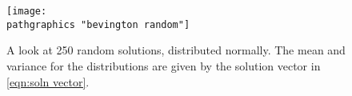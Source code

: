 \begin{figure}[t]
	\texttt{[image: \\pathgraphics "bevington random"]}
	\caption[A look at 250 random solutions, distributed normally]{A look at 250 random solutions, distributed normally. The mean and variance for the distributions are given by the solution vector in \eqref{eqn:soln vector}.}
	\label{fig:random}
\end{figure}

\endinput  %